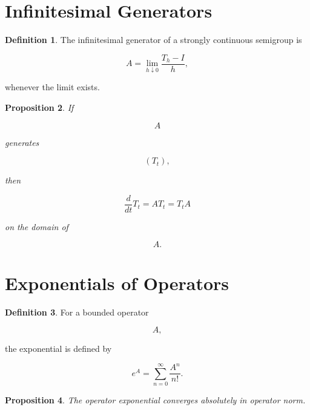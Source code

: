 \documentclass[11pt]{book}
\numberwithin{equation}{chapter}
\theoremstyle{definition}
\newtheorem{definition}{Definition}[chapter]
\theoremstyle{plain}
\newtheorem{proposition}[definition]{Proposition}
\begin{document}
\section{Infinitesimal Generators}

\begin{definition}

The infinitesimal generator of a strongly continuous semigroup is

\[
A
=
\lim_{h\downarrow0}
\frac{T_h-I}{h},
\]

whenever the limit exists.

\end{definition}


\begin{proposition}

If

\[
A
\]

generates

\[
(T_t),
\]

then

\[
\frac{d}{dt}
T_t
=
AT_t
=
T_tA
\]

on the domain of

\[
A.
\]

\end{proposition}


\section{Exponentials of Operators}

\begin{definition}

For a bounded operator

\[
A,
\]

the exponential is defined by

\[
e^A
=
\sum_{n=0}^{\infty}
\frac{A^n}{n!}.
\]

\end{definition}


\begin{proposition}

The operator exponential converges absolutely in operator norm.

\end{proposition}
\end{document}
